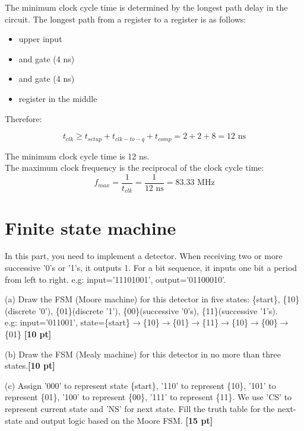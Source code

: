 \documentclass[a4paper]{article}
\begin{document}
\begin{answer}[Question 2]
    The minimum clock cycle time is determined by the longest path delay in the circuit.
    The longest path from a register to a register is as follows:

    \begin{itemize}
        \item upper input
        \item and gate (4 ns)
        \item and gate (4 ns)
        \item register in the middle
    \end{itemize}

    Therefore:

    \[
    t_{clk} \ge t_{setup} + t_{clk-to-q} + t_{comp} = 2 + 2 + 8 = 12 \text{ ns}
    \]

    The minimum clock cycle time is 12 ns.\\
    The maximum clock frequency is the reciprocal of the clock cycle time:
    \[
    f_{max} = \frac{1}{t_{clk}} = \frac{1}{12 \text{ ns}} = 83.33 \text{ MHz}
    \]
\end{answer}

\newpage
\section{Finite state machine}
In this part, you need to implement a detector. When receiving two or more successive '0's or '1's, it outputs 1. For a bit sequence, it inputs one bit a period from left to right. e.g: input='11101001', output='01100010'.

(a) Draw the FSM (Moore machine) for this detector in five states: \{start\}, \{10\}(discrete '0'), \{01\}(discrete '1'), \{00\}(successive '0's), \{11\}(successive '1's). \\
e.g: input='011001', state=\{start\}$\xrightarrow{}$\{10\}$\xrightarrow{}$\{01\}$\xrightarrow{}$\{11\}$\xrightarrow{}$\{10\}$\xrightarrow{}$\{00\}$\xrightarrow{}$\{01\} \textbf{[10 pt]}

(b) Draw the FSM (Mealy machine) for this detector in no more than three states.\textbf{[10 pt]}

(c) Assign '000' to represent state \{start\}, '110' to represent \{10\}, '101' to represent \{01\}, '100' to represent \{00\}, '111' to represent \{11\}. We use 'CS' to represent current state and 'NS' for next state. Fill the truth table for the next-state and output logic based on the Moore FSM. \textbf{[15 pt]}
\end{document}
